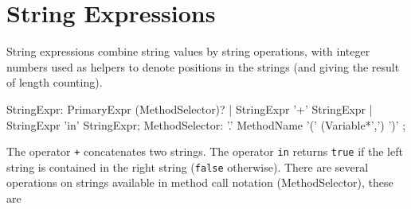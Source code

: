 \section{String Expressions}

String expressions combine string values by string operations, with integer numbers used as helpers to denote positions in the strings (and giving the result of length counting).

\begin{rail}
  StringExpr: PrimaryExpr (MethodSelector)? | StringExpr '+' StringExpr | StringExpr 'in' StringExpr;
  MethodSelector: '.' MethodName '(' (Variable*',') ')' ;
\end{rail}
The operator \texttt{+} concatenates two strings.
The operator \texttt{in} returns \texttt{true} if the left string is contained in the right string (\texttt{false} otherwise).
There are several operations on strings available in method call notation (MethodSelector), these are

